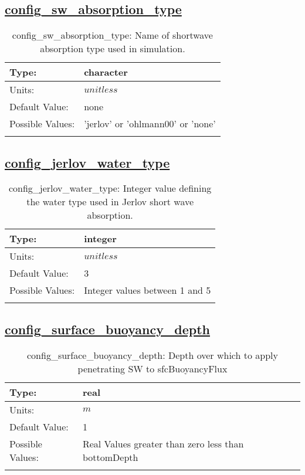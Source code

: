 \subsection[config\_sw\_absorption\_type]{\hyperref[sec:nm_tab_shortwaveRadiation]{config\_sw\_absorption\_type}}
\label{subsec:nm_sec_config_sw_absorption_type}
\begin{center}
\begin{longtable}{| p{2.0in} || p{4.0in} |}
    \hline
    Type: & character \\
    \hline
    Units: & $unitless$ \\
    \hline
    Default Value: & none \\
    \hline
    Possible Values: & 'jerlov' or 'ohlmann00' or 'none' \\
    \hline
    \caption{config\_sw\_absorption\_type: Name of shortwave absorption type used in simulation. }
\end{longtable}
\end{center}
\subsection[config\_jerlov\_water\_type]{\hyperref[sec:nm_tab_shortwaveRadiation]{config\_jerlov\_water\_type}}
\label{subsec:nm_sec_config_jerlov_water_type}
\begin{center}
\begin{longtable}{| p{2.0in} || p{4.0in} |}
    \hline
    Type: & integer \\
    \hline
    Units: & $unitless$ \\
    \hline
    Default Value: & 3 \\
    \hline
    Possible Values: & Integer values between 1 and 5 \\
    \hline
    \caption{config\_jerlov\_water\_type: Integer value defining the water type used in Jerlov short wave absorption.}
\end{longtable}
\end{center}
\subsection[config\_surface\_buoyancy\_depth]{\hyperref[sec:nm_tab_shortwaveRadiation]{config\_surface\_buoyancy\_depth}}
\label{subsec:nm_sec_config_surface_buoyancy_depth}
\begin{center}
\begin{longtable}{| p{2.0in} || p{4.0in} |}
    \hline
    Type: & real \\
    \hline
    Units: & $m$ \\
    \hline
    Default Value: & 1 \\
    \hline
    Possible Values: & Real Values greater than zero less than bottomDepth \\
    \hline
    \caption{config\_surface\_buoyancy\_depth: Depth over which to apply penetrating SW to sfcBuoyancyFlux}
\end{longtable}
\end{center}
